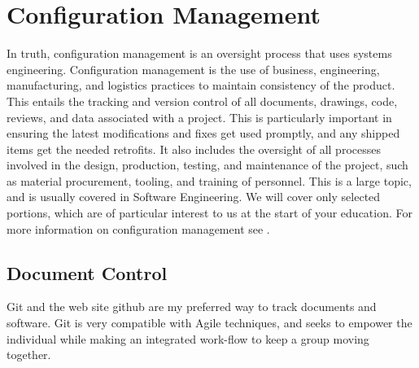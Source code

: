 \section{Configuration Management}
In truth, configuration management is an oversight process that uses systems engineering.  Configuration management is the use of business, engineering, manufacturing, and logistics practices to maintain consistency of the product.  This entails the tracking and version control of all documents, drawings, code, reviews, and data associated with a project.  This is particularly important in ensuring the latest modifications and fixes get used promptly, and any shipped items get the needed retrofits.  It also includes the oversight of all processes involved in the design, production, testing, and maintenance of the project, such as material procurement, tooling, and training of personnel.  This is a large topic, and is usually covered in Software Engineering.  We will cover only selected portions, which are of particular interest to us at the start of your education.  For more information on configuration management see \cite{ANSI649A, MIL-HDBK-61A, EIA836, ISO10007}.

\subsection{Document Control}

Git and the web site github are my preferred way to track documents and software.  Git is very compatible with Agile techniques, and seeks to empower the individual while making an integrated work-flow to keep a group moving together.

